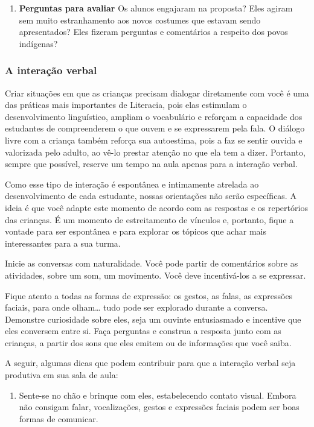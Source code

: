 \documentclass[11pt]{extarticle}
\begin{document}
{{\begin{enumerate}
\item \textbf{Perguntas para avaliar} Os alunos engajaram na proposta? 
Eles agiram sem muito estranhamento aos novos costumes que estavam sendo apresentados?
Eles fizeram perguntas e comentários a respeito dos povos indígenas?
\end{enumerate}

\subsubsection{A interação verbal} 
Criar situações em que as crianças precisam dialogar diretamente com 
você é uma das práticas mais importantes de Literacia, pois elas estimulam 
o desenvolvimento linguístico, ampliam o vocabulário e reforçam a 
capacidade dos estudantes de compreenderem o que ouvem e se expressarem 
pela fala. O diálogo livre com a criança também reforça sua autoestima, pois 
a faz se sentir ouvida e valorizada pelo adulto, ao vê-lo prestar atenção 
no que ela tem a dizer. Portanto, sempre que possível, reserve um tempo na 
aula apenas para a interação verbal. 

Como esse tipo de interação é espontânea e intimamente atrelada ao 
desenvolvimento de cada estudante, nossas orientações não serão específicas. 
A ideia é que você adapte este momento de acordo com as respostas e os 
repertórios das crianças. É um momento de estreitamento de vínculos e, portanto, 
fique a vontade para ser espontânea e para explorar os tópicos que achar 
mais interessantes para a sua turma.

Inicie as conversas com naturalidade. Você pode partir de comentários
sobre as atividades, sobre um som, um movimento. Você deve incentivá-los a 
se expressar.

Fique atento a todas as formas de expressão: os gestos, as falas, as 
expressões faciais, para onde olham\ldots{} tudo pode ser explorado durante a conversa. 
Demonstre curiosidade sobre eles, seja um ouvinte entusiasmado e incentive que eles 
conversem entre si. Faça perguntas e construa a resposta junto com as crianças, 
a partir dos sons que eles emitem ou de informações que você saiba. 

A seguir, algumas dicas que podem contribuir para que a interação verbal 
seja produtiva em sua sala de aula: 

\begin{enumerate}
\item Sente-se no chão e brinque com eles, estabelecendo 
contato visual. Embora não consigam falar, vocalizações, 
gestos e expressões faciais podem ser boas formas de comunicar.


\end{enumerate}}}
\end{document}
